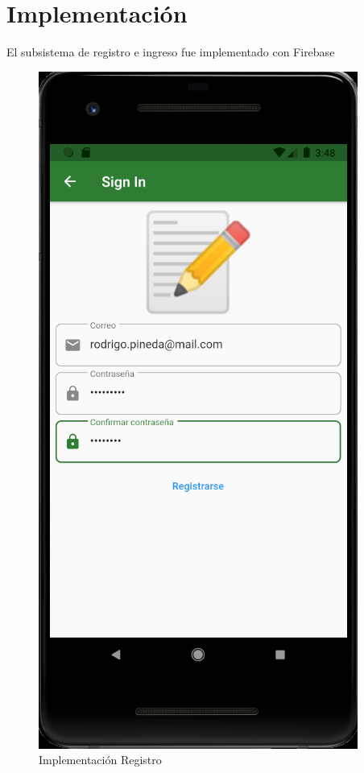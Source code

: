 \documentclass{article}
\begin{document}
\section{Implementación}
El subsistema de registro e ingreso fue implementado con Firebase 
\begin{figure}[H]
    \centering
    \includegraphics[scale=0.8]{imgs/Imp/Registro}
    \caption{Implementación Registro}
\end{figure}
\end{document}
